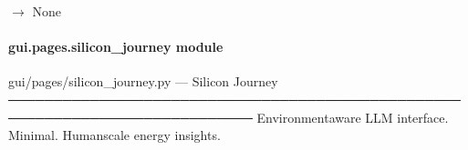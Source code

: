 \documentclass[letterpaper,10pt,english]{sphinxmanual}
\begin{document}
\begin{fulllineitems}
\label{\detokenize{gui.pages.silicon_compare:gui.pages.silicon_compare.render}}
\pysigstartsignatures
\pysiglinewithargsret
{}
{}
{{ $\rightarrow$ None}}
\pysigstopsignatures
\end{fulllineitems}


\sphinxstepscope


\paragraph{gui.pages.silicon\_journey module}
\label{\detokenize{gui.pages.silicon_journey:module-gui.pages.silicon_journey}}\label{\detokenize{gui.pages.silicon_journey:gui-pages-silicon-journey-module}}\label{\detokenize{gui.pages.silicon_journey::doc}}
\sphinxAtStartPar
gui/pages/silicon\_journey.py  —  Silicon Journey
─────────────────────────────────────────────────────────────────────────────
Environment\sphinxhyphen{}aware LLM interface. Minimal. Human\sphinxhyphen{}scale energy insights.
\end{document}
